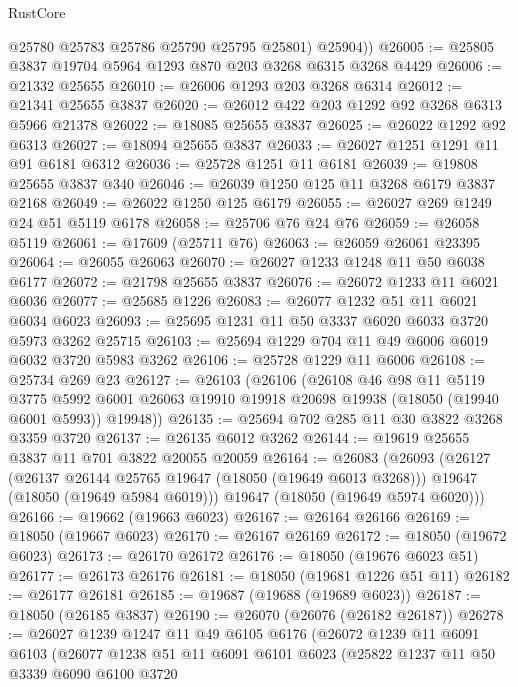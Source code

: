 \begin{lexlean}{RustCore}
\begin{coremodule}
          @25780
          @25783
          @25786
          @25790
          @25795
          @25801)
        @25904))
@26005 := @25805 @3837 @19704 @5964 @1293 @870 @203 @3268 @6315 @3268 @4429
@26006 := @21332 @25655
@26010 := @26006 @1293 @203 @3268 @6314
@26012 := @21341 @25655 @3837
@26020 := @26012 @422 @203 @1292 @92 @3268 @6313 @5966 @21378
@26022 := @18085 @25655 @3837
@26025 := @26022 @1292 @92 @6313
@26027 := @18094 @25655 @3837
@26033 := @26027 @1251 @1291 @11 @91 @6181 @6312
@26036 := @25728 @1251 @11 @6181
@26039 := @19808 @25655 @3837 @340
@26046 := @26039 @1250 @125 @11 @3268 @6179 @3837 @2168
@26049 := @26022 @1250 @125 @6179
@26055 := @26027 @269 @1249 @24 @51 @5119 @6178
@26058 := @25706 @76 @24 @76
@26059 := @26058 @5119
@26061 := @17609 (@25711 @76)
@26063 := @26059 @26061 @23395
@26064 := @26055 @26063
@26070 := @26027 @1233 @1248 @11 @50 @6038 @6177
@26072 := @21798 @25655 @3837
@26076 := @26072 @1233 @11 @6021 @6036
@26077 := @25685 @1226
@26083 := @26077 @1232 @51 @11 @6021 @6034 @6023
@26093 := @25695 @1231 @11 @50 @3337 @6020 @6033 @3720 @5973 @3262 @25715
@26103 := @25694 @1229 @704 @11 @49 @6006 @6019 @6032 @3720 @5983 @3262
@26106 := @25728 @1229 @11 @6006
@26108 := @25734 @269 @23
@26127 := @26103
    (@26106
      (@26108
        @46
        @98
        @11
        @5119
        @3775
        @5992
        @6001
        @26063
        @19910
        @19918
        @20698
        @19938
        (@18050 (@19940 @6001 @5993))
        @19948))
@26135 := @25694 @702 @285 @11 @30 @3822 @3268 @3359 @3720
@26137 := @26135 @6012 @3262
@26144 := @19619 @25655 @3837 @11 @701 @3822 @20055 @20059
@26164 := @26083
    (@26093
      (@26127
        (@26137 @26144 @25765 @19647 (@18050 (@19649 @6013 @3268)))
        @19647
        (@18050 (@19649 @5984 @6019)))
      @19647
      (@18050 (@19649 @5974 @6020)))
@26166 := @19662 (@19663 @6023)
@26167 := @26164 @26166
@26169 := @18050 (@19667 @6023)
@26170 := @26167 @26169
@26172 := @18050 (@19672 @6023)
@26173 := @26170 @26172
@26176 := @18050 (@19676 @6023 @51)
@26177 := @26173 @26176
@26181 := @18050 (@19681 @1226 @51 @11)
@26182 := @26177 @26181
@26185 := @19687 (@19688 (@19689 @6023))
@26187 := @18050 (@26185 @3837)
@26190 := @26070 (@26076 (@26182 @26187))
@26278 := @26027
    @1239
    @1247
    @11
    @49
    @6105
    @6176
    (@26072
      @1239
      @11
      @6091
      @6103
      (@26077
        @1238
        @51
        @11
        @6091
        @6101
        @6023
        (@25822
          @1237
          @11
          @50
          @3339
          @6090
          @6100
          @3720

\end{coremodule}
\end{lexlean}
